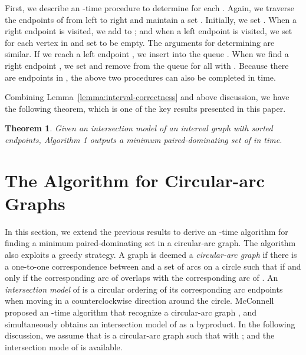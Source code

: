\documentclass[12pt]{article}
\newtheorem{theorem}{Theorem}
\begin{document}
First, we describe an -time procedure to determine 
for each . Again, we traverse the endpoints of 
from left to right and maintain a set . Initially, we set . When a right endpoint  is visited, we add
 to ; and when a left endpoint  is visited, we
set  for each vertex  in  and set  to be
empty. The arguments for determining  are similar. If we
reach a left endpoint , we insert  into the queue
. When we find a right endpoint , we set 
and remove  from the queue for all  with .
Because there are  endpoints in , the above two procedures
can also be completed in  time.

Combining Lemma~\ref{lemma:interval-correctness} and above
discussion, we have the following theorem, which is one of the key
results presented in this paper.

\begin{theorem} \label{theorem:interval} Given an intersection
model  of an interval graph  with sorted endpoints,
Algorithm 1 outputs a minimum paired-dominating set  of  in
 time.
\end{theorem}



\section{The Algorithm for Circular-arc Graphs
                              \label{section:algo-cir}}


In this section, we extend the previous results to derive an
-time algorithm for finding a minimum paired-dominating
set in a circular-arc graph. The algorithm also exploits a greedy strategy. A graph  is deemed a {\em circular-arc graph} if there is a one-to-one correspondence between  and a set of arcs on a circle such that  if and only if the corresponding arc of  overlaps with the corresponding arc of . An {\em intersection model} of  is a circular ordering of its corresponding arc endpoints when moving in a counterclockwise direction around the circle. McConnell~\cite{McConnell03} proposed an -time algorithm that recognize a circular-arc graph , and simultaneously obtains an intersection model of  as a byproduct. In the following discussion, we assume that   is a circular-arc graph such that  with ; and  the intersection mode  of  is available.

\hspace{1pt}
\end{document}
